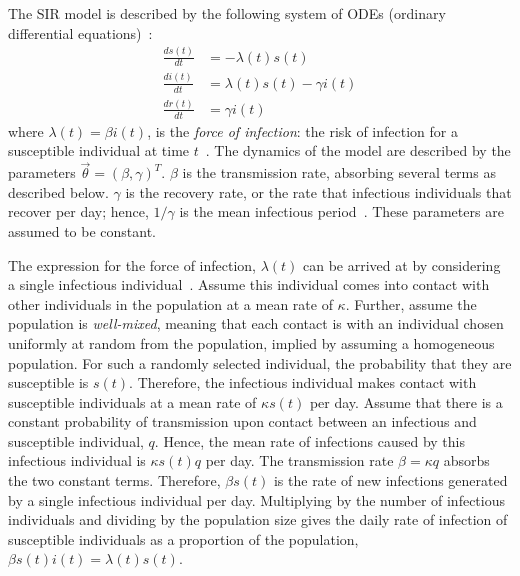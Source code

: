 \documentclass[thesis.tex]{subfiles}
\begin{document}
The SIR model is described by the following system of ODEs (ordinary differential equations)~\autocite[19]{keelingModeling}:
\begin{align}
\frac{ds(t)}{dt} &= -\lambda(t) s(t) \\
\frac{di(t)}{dt} &= \lambda(t) s(t) - \gamma i(t) \\
\frac{dr(t)}{dt} &= \gamma i(t)
\end{align}
where $\lambda(t) = \beta i(t)$, is the \emph{force of infection}: the risk of infection for a susceptible individual at time $t$~\autocite[17]{keelingModeling}.
The dynamics of the model are described by the parameters $\vec{\theta} = (\beta, \gamma)^T$.
$\beta$ is the transmission rate, absorbing several terms as described below.
$\gamma$ is the recovery rate, or the rate that infectious individuals that recover per day; hence, $1/\gamma$ is the mean infectious period~\autocite[367]{keelingModeling}.
These parameters are assumed to be constant.

The expression for the force of infection, $\lambda(t)$ can be arrived at by considering a single infectious individual~\autocite[214]{kretzschmarMathematical}.
Assume this individual comes into contact with other individuals in the population at a mean rate of $\kappa$.
Further, assume the population is \emph{well-mixed}, meaning that each contact is with an individual chosen uniformly at random from the population, implied by assuming a homogeneous population.
For such a randomly selected individual, the probability that they are susceptible is $s(t)$.
Therefore, the infectious individual makes contact with susceptible individuals at a mean rate of $\kappa s(t)$ per day.
Assume that there is a constant probability of transmission upon contact between an infectious and susceptible individual, $q$.
Hence, the mean rate of infections caused by this infectious individual is $\kappa s(t) q$ per day.
The transmission rate $\beta = \kappa q$ absorbs the two constant terms.
Therefore, $\beta s(t)$ is the rate of new infections generated by a single infectious individual per day.
Multiplying by the number of infectious individuals and dividing by the population size gives the daily rate of infection of susceptible individuals as a proportion of the population, $\beta s(t) i(t) = \lambda(t) s(t)$.
\end{document}
